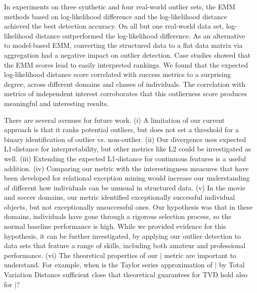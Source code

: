 {In experiments on three synthetic and four real-world outlier sets, the EMM methods based on log-likelihood difference and the log-likelihood distance achieved the best detection accuracy. On all but one real-world data set, log-likelihood distance outperformed the log-likelihood difference. As an alternative to model-based EMM, converting the structured data to a flat data matrix via aggregation had a negative impact on outlier detection. 
Case studies showed that the EMM scores lead to easily interpreted rankings. We found that the expected log-likelihood distance score correlated with success metrics to a surprising degree, across different domains and classes of individuals. The correlation with metrics of independent interest corroborates that this outlierness score produces meaningful and interesting results.
%

 							
There are several avenues for future work.  (i) A limitation of our current approach is that it ranks potential outliers, but does not set a threshold for a binary identification of outlier vs. non-outlier. (ii) Our divergence uses expected L1-distance for interpretability, but other metrics like L2 could be investigated as well. (iii) Extending the expected L1-distance for continuous features is a useful addition. (iv) Comparing our metric with the interestingness measures that have been developed for relational exception mining would increase our understanding of different how individuals can be unusual in structured data. (v) In the movie and soccer domains, our metric identified exceptionally successful individual objects, but not exceptionally unsuccessful ones. Our hypothesis was that in these domains, individuals have gone through a rigorous selection process, so the normal baseline performance is high. While we provided evidence for this hypothesis, it can be further investigated,  by applying our outlier detection to data sets that feature a range of skills, including both amateur and professional performance. (vi) The theoretical properties of our $\mid$ metric are important to understand. For example, when is the Taylor series approximation of $\mid$ by Total Variation Distance sufficient close that theoretical guarantees for TVD hold also for $\mid$?
								
}
